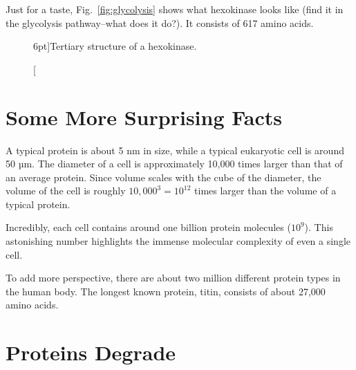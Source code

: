 Just for a taste, Fig.~\ref{fig:glycolysis} shows what hexokinase looks like (find it in the glycolysis pathway--what does it do?). It consists of 617 amino acids.

\begin{figure}
    \caption[][6pt]{Tertiary structure of a hexokinase.}
    \label{fig:hexokinase}
\end{figure}

\section{Some More Surprising Facts}

A typical protein is about 5 nm in size, 
while a typical eukaryotic cell is around 50 µm. The diameter of a cell is approximately 10,000 times larger than that of an average protein. Since volume scales with the cube of the diameter, the volume of the cell is roughly $10,000^3 = 10^{12}$ times larger than the volume of a typical protein.

Incredibly, each cell contains around one billion protein molecules ($10^9$). This astonishing number highlights the immense molecular complexity of even a single cell.

To add more perspective, there are about two million different protein types in the human body. The longest known protein, titin, consists of about 27,000 amino acids.

\section{Proteins Degrade}

